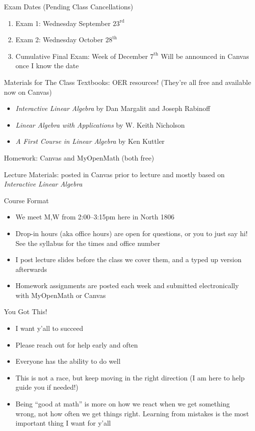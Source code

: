 \documentclass[aspectratio=169]{beamer}
\begin{document}
\begin{frame}{Exam Dates (Pending Class Cancellations)}
    \begin{enumerate}
        \item Exam 1: Wednesday September $23^\text{rd}$
        \item Exam 2: Wednesday October $28^\text{th}$
        \item Cumulative Final Exam: Week of December $7^\text{th}$ Will be announced in Canvas once I know the date
    \end{enumerate}
\end{frame}
\begin{frame}{Materials for The Class}
    Textbooks: OER resources! (They're all free and available now on Canvas)
    \begin{itemize}
        \item \textit{Interactive Linear Algebra} by Dan Margalit and Joseph Rabinoff
        \item \textit{Linear Algebra with Applications} by W. Keith Nicholson
        \item \textit{A First Course in Linear Algebra} by Ken Kuttler
    \end{itemize}
    \pause
    Homework: Canvas and MyOpenMath (both free)

    \pause
    Lecture Materials: posted in Canvas prior to lecture and mostly based on \textit{Interactive Linear Algebra}
\end{frame}
\begin{frame}{Course Format}
    \begin{itemize}
        \item We meet M,W from 2:00--3:15pm here in North 1806
        \item Drop-in hours (aka office hours) are open for questions, or you to just say hi! See the syllabus for the times and office number
        \item I post lecture slides before the class we cover them, and a typed up version afterwards
        \item Homework assignments are posted each week and submitted electronically with MyOpenMath or Canvas
    \end{itemize}
\end{frame}
\begin{frame}{You Got This!}
    \begin{itemize}
        \item I want y'all to succeed
        \item Please reach out for help early and often
        \item Everyone has the ability to do well
        \item This is not a race, but keep moving in the right direction (I am here to help guide you if needed!)
        \item Being ``good at math'' is more on how we react when we get something wrong, not how often we get things right. Learning from mistakes is the most important thing I want for y'all
    \end{itemize}
\end{frame}
\end{document}
